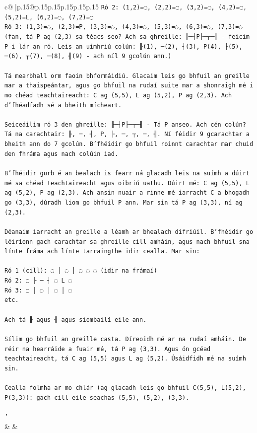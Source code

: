 \documentclass{article}
\begin{document}
{\begin{supertabular}{c@{$\;$}|p{.15\linewidth}@{}p{.15\linewidth}p{.15\linewidth}p{.15\linewidth}p{.15\linewidth}p{.15\linewidth}}
{{{\texttt{Ró 2: (1,2)=◌, (2,2)=◌, (3,2)=◌, (4,2)=◌, (5,2)=L, (6,2)=◌, (7,2)=◌} \\
\texttt{Ró 3: (1,3)=◌, (2,3)=P, (3,3)=◌, (4,3)=◌, (5,3)=◌, (6,3)=◌, (7,3)=◌  (fan, tá P ag (2,3) sa téacs seo? Ach sa ghreille: ╟─┤P├─┬─╢ {-} feicim P i lár an ró. Leis an uimhriú colún: ╟(1), ─(2), ┤(3), P(4), ├(5), ─(6), ┬(7), ─(8), ╢(9) {-} ach níl 9 gcolún ann.)} \\
\\ 
\texttt{Tá mearbhall orm faoin bhformáidiú. Glacaim leis go bhfuil an greille mar a thaispeántar, agus go bhfuil na rudaí suite mar a shonraigh mé i mo chéad teachtaireacht: C ag (5,5), L ag (5,2), P ag (2,3). Ach d'fhéadfadh sé a bheith mícheart.} \\
\\ 
\texttt{Seiceáilim ró 3 den ghreille: ╟─┤P├─┬─╢ {-} Tá P anseo. Ach cén colún? Tá na carachtair: ╟, ─, ┤, P, ├, ─, ┬, ─, ╢. Ní féidir 9 gcarachtar a bheith ann do 7 gcolún. B'fhéidir go bhfuil roinnt carachtar mar chuid den fhráma agus nach colúin iad.} \\
\\ 
\texttt{B'fhéidir gurb é an bealach is fearr ná glacadh leis na suímh a dúirt mé sa chéad teachtaireacht agus oibriú uathu. Dúirt mé: C ag (5,5), L ag (5,2), P ag (2,3). Ach ansin nuair a rinne mé iarracht C a bhogadh go (3,3), dúradh liom go bhfuil P ann. Mar sin tá P ag (3,3), ní ag (2,3).} \\
\\ 
\texttt{Déanaim iarracht an greille a léamh ar bhealach difriúil. B'fhéidir go léiríonn gach carachtar sa ghreille cill amháin, agus nach bhfuil sna línte fráma ach línte tarraingthe idir cealla. Mar sin:} \\
\\ 
\texttt{Ró 1 (cill): ◌ │ ◌ │ ◌ ◌ ◌  (idir na frámaí)} \\
\texttt{Ró 2: ◌ ├ ─ ┤ ◌ L ◌} \\
\texttt{Ró 3: ◌ │ ◌ │ ◌ │ ◌} \\
\texttt{etc.} \\
\\ 
\texttt{Ach tá ╟ agus ╢ agus siombailí eile ann.} \\
\\ 
\texttt{Sílim go bhfuil an greille casta. Díreoidh mé ar na rudaí amháin. De réir na hearráide a fuair mé, tá P ag (3,3). Agus ón gcéad teachtaireacht, tá C ag (5,5) agus L ag (5,2). Úsáidfidh mé na suímh sin.} \\
\\ 
\texttt{Cealla folmha ar mo chlár (ag glacadh leis go bhfuil C(5,5), L(5,2), P(3,3)): gach cill eile seachas (5,5), (5,2), (3,3).} \\
\\ 
\texttt{'} \\
            }
        }
    }
    & & \\ \\


\end{supertabular}}
\end{document}
